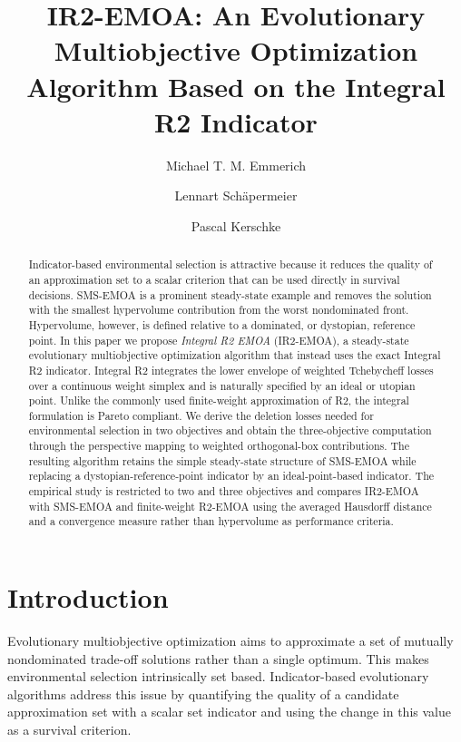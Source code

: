 \documentclass[runningheads]{llncs}
\title{IR2-EMOA: An Evolutionary Multiobjective Optimization Algorithm Based on the Integral R2 Indicator}
\author{Michael T. M. Emmerich\inst{1} \and
Lennart Sch\"apermeier\inst{2} \and
Pascal Kerschke\inst{2}}
\institute{Faculty of Information Technology, University of Jyv\"askyl\"a, Jyv\"askyl\"a, Finland
\and
TU Dresden, Dresden, Germany\\
\email{\{lennart.schaepermeier,pascal.kerschke\}@tu-dresden.de}}
\begin{document}
\maketitle

\begin{abstract}
Indicator-based environmental selection is attractive because it reduces the quality of an approximation set to a scalar criterion that can be used directly in survival decisions. SMS-EMOA is a prominent steady-state example and removes the solution with the smallest hypervolume contribution from the worst nondominated front. Hypervolume, however, is defined relative to a dominated, or dystopian, reference point. In this paper we propose \emph{Integral R2 EMOA} (IR2-EMOA), a steady-state evolutionary multiobjective optimization algorithm that instead uses the exact Integral R2 indicator. Integral R2 integrates the lower envelope of weighted Tchebycheff losses over a continuous weight simplex and is naturally specified by an ideal or utopian point. Unlike the commonly used finite-weight approximation of R2, the integral formulation is Pareto compliant. We derive the deletion losses needed for environmental selection in two objectives and obtain the three-objective computation through the perspective mapping to weighted orthogonal-box contributions. The resulting algorithm retains the simple steady-state structure of SMS-EMOA while replacing a dystopian-reference-point indicator by an ideal-point-based indicator. The empirical study is restricted to two and three objectives and compares IR2-EMOA with SMS-EMOA and finite-weight R2-EMOA using the averaged Hausdorff distance and a convergence measure rather than hypervolume as performance criteria.
\end{abstract}

\section{Introduction}
\label{sec:introduction}

Evolutionary multiobjective optimization aims to approximate a set of mutually nondominated trade-off solutions rather than a single optimum. This makes environmental selection intrinsically set based. Indicator-based evolutionary algorithms address this issue by quantifying the quality of a candidate approximation set with a scalar set indicator and using the change in this value as a survival criterion.
\end{document}

